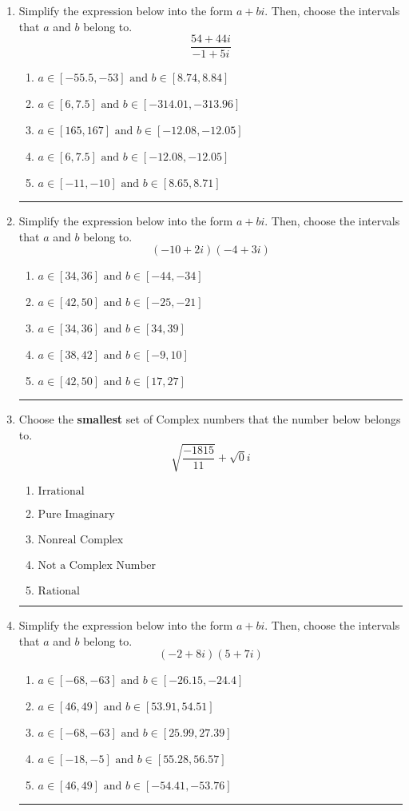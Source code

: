 \documentclass[14pt]{extbook}
\newcommand{\litem}[1]{\item#1\hspace*{-1cm}\rule{\textwidth}{0.4pt}}
\begin{document}
\begin{enumerate}
{\begin{enumerate}[label=\Alph*.]
\end{enumerate} }
\litem{
Simplify the expression below into the form $a+bi$. Then, choose the intervals that $a$ and $b$ belong to.\[ \frac{54 + 44 i}{-1 + 5 i} \]\begin{enumerate}[label=\Alph*.]
\item \( a \in [-55.5, -53] \text{ and } b \in [8.74, 8.84] \)
\item \( a \in [6, 7.5] \text{ and } b \in [-314.01, -313.96] \)
\item \( a \in [165, 167] \text{ and } b \in [-12.08, -12.05] \)
\item \( a \in [6, 7.5] \text{ and } b \in [-12.08, -12.05] \)
\item \( a \in [-11, -10] \text{ and } b \in [8.65, 8.71] \)

\end{enumerate} }
\litem{
Simplify the expression below into the form $a+bi$. Then, choose the intervals that $a$ and $b$ belong to.\[ (-10 + 2 i)(-4 + 3 i) \]\begin{enumerate}[label=\Alph*.]
\item \( a \in [34, 36] \text{ and } b \in [-44, -34] \)
\item \( a \in [42, 50] \text{ and } b \in [-25, -21] \)
\item \( a \in [34, 36] \text{ and } b \in [34, 39] \)
\item \( a \in [38, 42] \text{ and } b \in [-9, 10] \)
\item \( a \in [42, 50] \text{ and } b \in [17, 27] \)

\end{enumerate} }
\litem{
Choose the \textbf{smallest} set of Complex numbers that the number below belongs to.\[ \sqrt{\frac{-1815}{11}}+\sqrt{0}i \]\begin{enumerate}[label=\Alph*.]
\item \( \text{Irrational} \)
\item \( \text{Pure Imaginary} \)
\item \( \text{Nonreal Complex} \)
\item \( \text{Not a Complex Number} \)
\item \( \text{Rational} \)

\end{enumerate} }
\litem{
Simplify the expression below into the form $a+bi$. Then, choose the intervals that $a$ and $b$ belong to.\[ (-2 + 8 i)(5 + 7 i) \]\begin{enumerate}[label=\Alph*.]
\item \( a \in [-68, -63] \text{ and } b \in [-26.15, -24.4] \)
\item \( a \in [46, 49] \text{ and } b \in [53.91, 54.51] \)
\item \( a \in [-68, -63] \text{ and } b \in [25.99, 27.39] \)
\item \( a \in [-18, -5] \text{ and } b \in [55.28, 56.57] \)
\item \( a \in [46, 49] \text{ and } b \in [-54.41, -53.76] \)


\end{enumerate}}
\end{enumerate}
\end{document}
